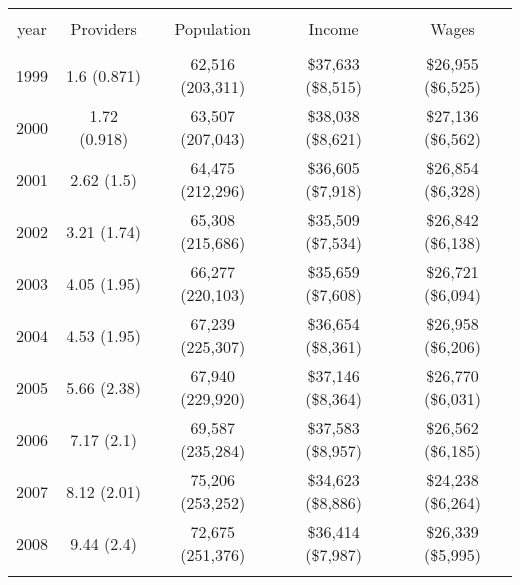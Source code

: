 
\begin{table}[!htbp] \centering 
  \caption{} 
  \label{} 
\begin{tabular}{@{\extracolsep{5pt}} ccccc} 
\\[-1.8ex]\hline 
\hline \\[-1.8ex] 
year & Providers & Population & Income & Wages \\ 
\hline \\[-1.8ex] 
1999 & 1.6 (0.871) & 62,516 (203,311) & \$37,633 (\$8,515) & \$26,955 (\$6,525) \\ 
2000 & 1.72 (0.918) & 63,507 (207,043) & \$38,038 (\$8,621) & \$27,136 (\$6,562) \\ 
2001 & 2.62 (1.5) & 64,475 (212,296) & \$36,605 (\$7,918) & \$26,854 (\$6,328) \\ 
2002 & 3.21 (1.74) & 65,308 (215,686) & \$35,509 (\$7,534) & \$26,842 (\$6,138) \\ 
2003 & 4.05 (1.95) & 66,277 (220,103) & \$35,659 (\$7,608) & \$26,721 (\$6,094) \\ 
2004 & 4.53 (1.95) & 67,239 (225,307) & \$36,654 (\$8,361) & \$26,958 (\$6,206) \\ 
2005 & 5.66 (2.38) & 67,940 (229,920) & \$37,146 (\$8,364) & \$26,770 (\$6,031) \\ 
2006 & 7.17 (2.1) & 69,587 (235,284) & \$37,583 (\$8,957) & \$26,562 (\$6,185) \\ 
2007 & 8.12 (2.01) & 75,206 (253,252) & \$34,623 (\$8,886) & \$24,238 (\$6,264) \\ 
2008 & 9.44 (2.4) & 72,675 (251,376) & \$36,414 (\$7,987) & \$26,339 (\$5,995) \\ 
\hline \\[-1.8ex] 
\end{tabular} 
\end{table} 
